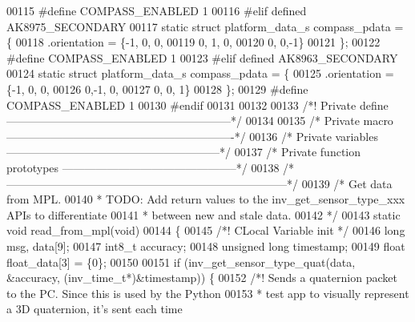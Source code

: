 \begin{DoxyCode}
00115 \textcolor{preprocessor}{#}\textcolor{preprocessor}{define} \textcolor{preprocessor}{COMPASS\_ENABLED} 1
00116 \textcolor{preprocessor}{#}\textcolor{preprocessor}{elif} \textcolor{preprocessor}{defined} \textcolor{preprocessor}{AK8975\_SECONDARY}
00117 \textcolor{keyword}{static} \textcolor{keyword}{struct} platform\_data\_s compass\_pdata = \{
00118     .orientation = \{-1, 0, 0,
00119                      0, 1, 0,
00120                      0, 0,-1\}
00121 \};
00122 \textcolor{preprocessor}{#}\textcolor{preprocessor}{define} \textcolor{preprocessor}{COMPASS\_ENABLED} 1
00123 \textcolor{preprocessor}{#}\textcolor{preprocessor}{elif} \textcolor{preprocessor}{defined} \textcolor{preprocessor}{AK8963\_SECONDARY}
00124 \textcolor{keyword}{static} \textcolor{keyword}{struct} platform\_data\_s compass\_pdata = \{
00125     .orientation = \{-1, 0, 0,
00126                      0,-1, 0,
00127                      0, 0, 1\}
00128 \};
00129 \textcolor{preprocessor}{#}\textcolor{preprocessor}{define} \textcolor{preprocessor}{COMPASS\_ENABLED} 1
00130 \textcolor{preprocessor}{#}\textcolor{preprocessor}{endif}
00131 
00132 
00133 \textcolor{comment}{/*! Private define ------------------------------------------------------------*/}
00134 
00135 \textcolor{comment}{/* Private macro -------------------------------------------------------------*/}
00136 \textcolor{comment}{/* Private variables ---------------------------------------------------------*/}
00137 \textcolor{comment}{/* Private function prototypes -----------------------------------------------*/}
00138 \textcolor{comment}{/* ---------------------------------------------------------------------------*/}
00139 \textcolor{comment}{/* Get data from MPL.}
00140 \textcolor{comment}{ * TODO: Add return values to the inv\_get\_sensor\_type\_xxx APIs to differentiate}
00141 \textcolor{comment}{ * between new and stale data.}
00142 \textcolor{comment}{ */}
00143 \textcolor{keyword}{static} \textcolor{keywordtype}{void} read_from_mpl(\textcolor{keywordtype}{void})
00144 \{
00145     \textcolor{comment}{/*! CLocal Variable init */}
00146     \textcolor{keywordtype}{long} msg, data[9];
00147     int8\_t accuracy;
00148     \textcolor{keywordtype}{unsigned} \textcolor{keywordtype}{long} timestamp;
00149     \textcolor{keywordtype}{float} float\_data[3] = \{0\};
00150 
00151     \textcolor{keywordflow}{if} (inv\_get\_sensor\_type\_quat(data, &accuracy, (inv\_time\_t*)&timestamp)) \{
00152        \textcolor{comment}{/*! Sends a quaternion packet to the PC. Since this is used by the Python}
00153 \textcolor{comment}{        * test app to visually represent a 3D quaternion, it's sent each time}

\end{DoxyCode}
